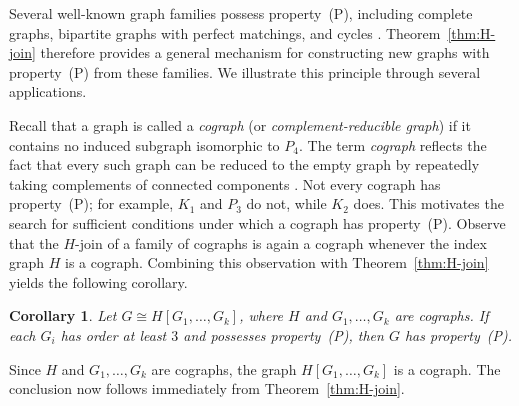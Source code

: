 \documentclass[12pt,reqno]{amsart}
\newtheorem{cor}[thm]{Corollary}
\theoremstyle{definition}
\numberwithin{equation}{subsection}
\newenvironment{pf}{\proof}{\endproof}
\numberwithin{equation}{section}
\begin{document}
Several well-known graph families possess property~(P), including complete graphs, bipartite graphs with perfect matchings, and cycles \cite{fons1,Howlader,sharma}. Theorem~\ref{thm:H-join} therefore provides a general mechanism for constructing new graphs with property~(P) from these families. We illustrate this principle through several applications.


Recall that a graph is called a \emph{cograph} (or \emph{complement-reducible graph}) if it contains no induced subgraph isomorphic to \(P_4\). The term \emph{cograph} reflects the fact that every such graph can be reduced to the empty graph by repeatedly taking complements of connected components \cite[p.~344]{west}. Not every cograph has property~(P); for example, \(K_1\) and \(P_3\) do not, while \(K_2\) does. This motivates the search for sufficient conditions under which a cograph has property~(P). Observe that the \(H\)-join of a family of cographs is again a cograph
whenever the index graph \(H\) is a cograph. Combining this observation
with Theorem~\ref{thm:H-join} yields the following corollary.

\begin{cor}\label{cor:cograph-P}
Let \(G\cong H[G_1,\dots,G_k]\), where \(H\) and \(G_1,\dots,G_k\) are cographs. If each \(G_i\) has order at least \(3\) and possesses property~(P), then \(G\) has property~(P).
\end{cor}

\begin{pf}
Since \(H\) and \(G_1,\dots,G_k\) are cographs, the graph
\(
H[G_1,\dots,G_k]
\)
is a cograph. The conclusion now follows immediately from Theorem~\ref{thm:H-join}.
\end{pf}
\end{document}
